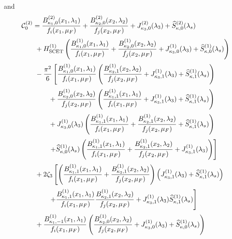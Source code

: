 and
\begin{equation}
\label{eq:C20}
\begin{aligned}
&\mathcal{C}^{(2)}_0=\frac{B_{\kappa_1,0}^{(2)}(x_1,\lambda_1)}{f_i(x_1,\mu_F)}+\frac{B_{\kappa_2,0}^{(2)}(x_2,\lambda_2)}{f_j(x_2,\mu_F)}+
    J_{\kappa_3,0}^{(2)}(\lambda_3)
    +\widehat{S}^{(2)}_{\kappa,0}(\lambda_s)\\[0.5ex]
    &\qquad + H^{(1)}_{\rm SCET}\left(\frac{B_{\kappa_1,0}^{(1)}(x_1,\lambda_1)}{f_i(x_1,\mu_F)}+\frac{B_{\kappa_2,0}^{(1)}(x_2,\lambda_2)}{f_j(x_2,\mu_F)}+
    J_{\kappa_3,0}^{(1)}(\lambda_3)
    +\widehat{S}^{(1)}_{\kappa,0}(\lambda_s)\right)\\[0.5ex]
    &\qquad -\frac{\pi^2}{6}\left[\frac{B_{\kappa_1,0}^{(1)}(x_1,\lambda_1)}{f_i(x_1,\mu_F)}\left(\frac{B_{\kappa_2,1}^{(1)}(x_2,\lambda_2)}{f_j(x_2,\mu_F)}+J_{\kappa_3,1}^{(1)}(\lambda_3)
    +\widehat{S}^{(1)}_{\kappa,1}(\lambda_s)\right)\right.\\[0.5ex]
    &\qquad\qquad+\frac{B_{\kappa_2,0}^{(1)}(x_2,\lambda_2)}{f_j(x_2,\mu_F)}\left(\frac{B_{\kappa_1,1}^{(1)}(x_1,\lambda_1)}{f_i(x_1,\mu_F)}+J_{\kappa_3,1}^{(1)}(\lambda_3)
    +\widehat{S}^{(1)}_{\kappa,1}(\lambda_s)\right)\\[0.5ex]
    &\qquad\qquad +J_{\kappa_3,0}^{(1)}(\lambda_3)\left(\frac{B_{\kappa_1,1}^{(1)}(x_1,\lambda_1)}{f_i(x_1,\mu_F)}+\frac{B_{\kappa_2,1}^{(1)}(x_2,\lambda_2)}{f_j(x_2,\mu_F)}+\widehat{S}^{(1)}_{\kappa,1}(\lambda_s)\right)\\[0.5ex]
    &\qquad\qquad \left.+\widehat{S}^{(1)}_{\kappa,0}(\lambda_s)\left(\frac{B_{\kappa_1,1}^{(1)}(x_1,\lambda_1)}{f_i(x_1,\mu_F)}+\frac{B_{\kappa_2,1}^{(1)}(x_2,\lambda_2)}{f_j(x_2,\mu_F)}+J_{\kappa_3,1}^{(1)}(\lambda_3)\right)\right]\\[0.5ex]
    &\qquad +2\zeta_3\left[\left(\frac{B^{(1)}_{\kappa_1,1}(x_1,\lambda_1)}{f_i(x_1,\mu_F)}+\frac{B^{(1)}_{\kappa_2,1}(x_2,\lambda_2)}{f_j(x_2,\mu_F)}\right)\left(J_{\kappa_3,1}^{(1)}(\lambda_3)+\widehat{S}^{(1)}_{\kappa,1}(\lambda_s)\right)\right.\\[0.5ex]
    &\qquad\qquad\left.+\frac{B^{(1)}_{\kappa_1,1}(x_1,\lambda_1)}{f_i(x_1,\mu_F)}\frac{B^{(1)}_{\kappa_2,1}(x_2,\lambda_2)}{f_j(x_2,\mu_F)}+J_{\kappa_3,1}^{(1)}(\lambda_3)\widehat{S}^{(1)}_{\kappa,1}(\lambda_s)\right]\\[0.5ex]
    &\qquad +\frac{B_{\kappa_1,-1}^{(1)}(x_1,\lambda_1)}{f_i(x_1,\mu_F)}\left(\frac{B_{\kappa_2,0}^{(1)}(x_2,\lambda_2)}{f_j(x_2,\mu_F)}+J_{\kappa_3,0}^{(1)}(\lambda_3)
    +\widehat{S}^{(1)}_{\kappa,0}(\lambda_s)\right)\\[0.5ex]

\end{aligned}
\end{equation}
